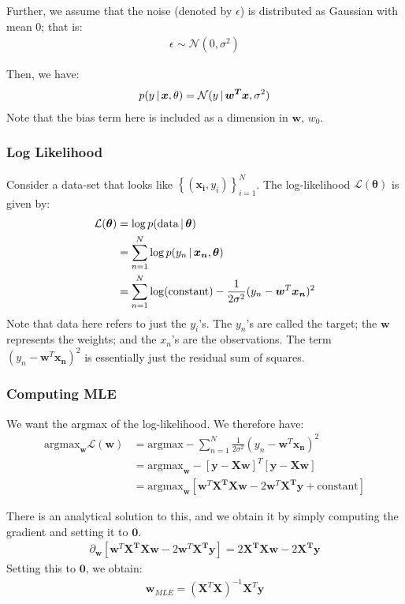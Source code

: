 \documentclass{article}
\renewcommand{\v}{\boldsymbol}
\begin{document}
\noindent Further, we assume that the noise (denoted by $\epsilon$) is distributed as Gaussian with mean $0$; that is:
	\begin{align*}
		\epsilon \sim \mathcal{N}(0, \sigma^2)
	\end{align*}
	
\noindent Then, we have:
	\begin{align*}
		p(y \given \v{x}, \theta) = \mathcal{N} (y \given \v{w^T}\v{x}, \sigma^2)
	\end{align*}
\noindent Note that the bias term here is included as a dimension in $\v{w}$, $w_0$.

\subsubsection{Log Likelihood}
Consider a data-set that looks like $\left \{ (\v{x_i}, y_i)\right\}_{i=1}^{N}$. The log-likelihood $\mathcal{L}(\v{\theta})$ is given by:
	\begin{align*}
		\mathcal{L}(\v{\theta}) &= \log p(\text{data} \given \v{\theta}) \\
							&= \sum_{n=1}^N \log p (y_n \given \v{x_n}, \v{\theta})\\
							&= \sum_{n=1}^N \log(\text{constant}) - \frac{1}{2 \sigma^2} (y_n - \v{w}^T \v{x_n})^2
	\end{align*}
	Note that data here refers to just the $y_i$'s. The $y_n$'s are called the target; the $\v{w}$ represents the weights; and the $x_n$'s are the observations. The term $(y_n - \v{w}^T \v{x_n})^2$ is essentially just the residual sum of squares.
	
	\subsubsection{Computing MLE}
	We want the argmax of the log-likelihood. We therefore have:
		\begin{align*}
			\text{argmax}_{\v{w}} \mathcal{L}(\v{w}) &= \text{argmax} - \sum_{n=1}^N \frac{1}{2 \sigma^2} (y_n - \v{w}^T \v{x_n})^2 \\
			&= \text{argmax}_{\v{w}} -  \left[ \v{y} - \v{X} \v{w} \right]^T \left[ \v{y} - \v{X} \v{w} \right] \\
			&= \text{argmax}_{\v{w}} \left[ \v{w}^T \v{X^T} \v{X} \v{w} - 2 \v{w}^T \v{X^T} \v{y} + \text{constant} \right]			
		\end{align*}
		
		There is an analytical solution to this, and we obtain it by simply computing the gradient and setting it to $\v{0}$. 
		\begin{align*}
			\partial_{\v{w}} \left [\v{w}^T \v{X^T} \v{X} \v{w} - 2 \v{w}^T \v{X^T} \v{y} \right] = 2 \v{X^T} \v{X} \v{w} - 2 \v{X^T} \v{y}
		\end{align*}
		Setting this to $\v{0}$, we obtain:
		\begin{align*}
			\v{w}_{MLE} = (\v{X}^T \v{X})^{-1} \v{X}^T \v{y}
		\end{align*}			
		
\end{document}
